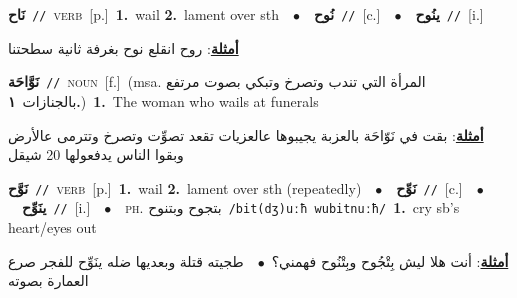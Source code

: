 \documentclass[10pt,a4paper,twoside]{article} %
\begin{document}
\begin{multicols}{2}
{\setlength\topsep{0pt}\textbf{\foreignlanguage{arabic}{نَاح}}\ {\color{gray}\texttt{//}\color{black}}\ \textsc{verb}\ [p.]\ \textbf{1.}~wail  \textbf{2.}~lament over sth\ \ $\bullet$\ \ \setlength\topsep{0pt}\textbf{\foreignlanguage{arabic}{نُوح}}\ {\color{gray}\texttt{//}\color{black}}\ [c.]\ \ $\bullet$\ \ \setlength\topsep{0pt}\textbf{\foreignlanguage{arabic}{ينُوح}}\ {\color{gray}\texttt{//}\color{black}}\ [i.]\  \begin{flushright}\color{gray}\foreignlanguage{arabic}{\textbf{\underline{\foreignlanguage{arabic}{أمثلة}}}: روح انقلع نوح بغرفة ثانية سطحتنا}\end{flushright}\color{black}} \vspace{2mm}

{\setlength\topsep{0pt}\textbf{\foreignlanguage{arabic}{نَوَّاحَة}}\ {\color{gray}\texttt{//}\color{black}}\ \textsc{noun}\ [f.]\ \color{gray}(msa. \foreignlanguage{arabic}{المرأة التي تندب وتصرخ وتبكي بصوت مرتفع بالجنازات}~\foreignlanguage{arabic}{\textbf{١.}})\color{black}\ \textbf{1.}~The woman who wails at funerals\  \begin{flushright}\color{gray}\foreignlanguage{arabic}{\textbf{\underline{\foreignlanguage{arabic}{أمثلة}}}: بقت في نَوّاحَة بالعزبة يجيبوها عالعزيات تقعد تصوِّت وتصرخ وتترمى عالأرض وبقوا الناس يدفعولها 20 شيقل}\end{flushright}\color{black}} \vspace{2mm}

{\setlength\topsep{0pt}\textbf{\foreignlanguage{arabic}{نَوَّح}}\ {\color{gray}\texttt{//}\color{black}}\ \textsc{verb}\ [p.]\ \textbf{1.}~wail  \textbf{2.}~lament over sth (repeatedly)\ \ $\bullet$\ \ \setlength\topsep{0pt}\textbf{\foreignlanguage{arabic}{نَوِّح}}\ {\color{gray}\texttt{//}\color{black}}\ [c.]\ \ $\bullet$\ \ \setlength\topsep{0pt}\textbf{\foreignlanguage{arabic}{ينَوِّح}}\ {\color{gray}\texttt{//}\color{black}}\ [i.]\ \ $\bullet$\ \ \textsc{ph.} \color{gray} \foreignlanguage{arabic}{بتجوح وبتنوح}\color{black}\ {\color{gray}\texttt{/{\sffamily bit(dʒ)uːħ wubitnuːħ}/}\color{black}}\ \textbf{1.}~cry sb's heart/eyes out\  \begin{flushright}\color{gray}\foreignlanguage{arabic}{\textbf{\underline{\foreignlanguage{arabic}{أمثلة}}}: أنت هلا ليش بِتْجُوح وبِتْنُوح فهمني؟\ $\bullet$\ \  طجيته قتلة وبعديها ضله ينَوِّح للفجر صرع العمارة بصوته}\end{flushright}\color{black}} \vspace{2mm}


\end{multicols}
\end{document}
